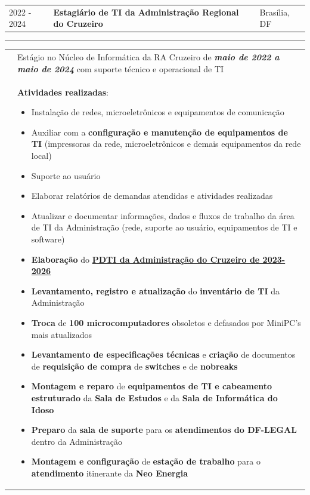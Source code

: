 \documentclass[10pt,A4]{article}
\newcommand{\tzlarrow}{(0,0) -- (0.2,0) -- (0.3,0.2) -- (0.2,0.4) -- (0,0.4) -- (0.1,0.2) -- cycle;}
\newcommand{\larrow}[1]
{\begin{tikzpicture}[scale=0.58]
	 \filldraw[fill=#1!100,draw=#1!100!black]  \tzlarrow
 \end{tikzpicture}
}
\newcommand{\cvevent}[5]
{
\vspace{8pt}
	\begin{tabular*}{1\textwidth}{p{2.3cm}  p{10.8cm} x{3.9cm}}
 \textcolor{bgcol}{#1}& \textbf{#2} & \vspace{2.5pt}\textcolor{sectcol}{#3}

	\end{tabular*}
\vspace{-12pt}
\textcolor{softcol}{\hrule}
\vspace{6pt}
	\begin{tabular*}{1\textwidth}{p{2.3cm} p{14.4cm}}
&		 \larrow{bgcol}  #4\\[3pt]
&		 \larrow{bgcol}  #5\\[6pt]
	\end{tabular*}

}
\begin{document}
%
\cvevent{2022 - 2024}{Estagiário de TI da Administração Regional do Cruzeiro}{Brasília, DF}{Estágio no Núcleo de Informática da RA Cruzeiro de \textit{\textbf{maio de 2022 a maio de 2024}} com suporte técnico e operacional de TI}{
    \textbf{Atividades realizadas}:
    \begin{itemize}
        \item Instalação de redes, microeletrônicos e equipamentos de comunicação
        \item Auxiliar com a \textbf{configuração e manutenção de equipamentos de TI} (impressoras da rede,  microeletrônicos e demais equipamentos da rede local)
        \item Suporte ao usuário
        \item Elaborar relatórios de demandas atendidas e atividades realizadas
        \item Atualizar e documentar informações, dados e fluxos de trabalho da área de TI da Administração (rede, suporte ao usuário, equipamentos de TI e software)
        \item \textbf{Elaboração} do \href{https://cruzeiro.df.gov.br/wp-conteudo/uploads/2024/04/PDTI-RA-CRUZ-\%E2\%80\%93-2023\_2026.pdf}{\textbf{PDTI da Administração do Cruzeiro de 2023-2026}}
        \item \textbf{Levantamento, registro e atualização} do \textbf{inventário de TI} da Administração
        \item \textbf{Troca} de \textbf{100 microcomputadores} obsoletos e defasados por MiniPC's mais atualizados
        \item \textbf{Levantamento de especificações técnicas} e \textbf{criação} de documentos de \textbf{requisição de compra} de \textbf{switches} e de \textbf{nobreaks}
        \item \textbf{Montagem e reparo} de \textbf{equipamentos de TI e cabeamento estruturado} da \textbf{Sala de Estudos} e da \textbf{Sala de Informática do Idoso}
        \item \textbf{Preparo} da \textbf{sala de suporte} para os \textbf{atendimentos do DF-LEGAL} dentro da Administração
        \item \textbf{Montagem e configuração} de \textbf{estação de trabalho} para o \textbf{atendimento} itinerante da \textbf{Neo Energia}
    \end{itemize}
}


\end{document}
